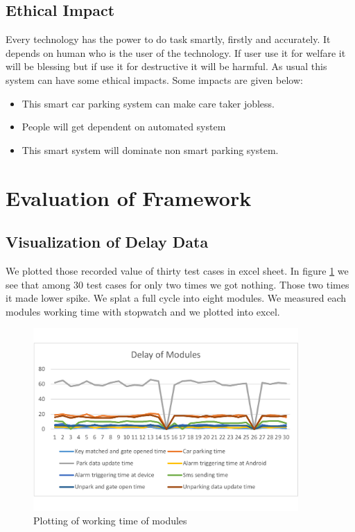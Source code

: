 \subsection{Ethical Impact}
Every technology has the power to do task smartly, firstly and accurately. It depends on human who is the user of the technology. If user use it for welfare it will be blessing but if use it for destructive it will be harmful. As usual this system can have some ethical impacts. Some impacts are given below:
\begin{itemize}
    \item This smart car parking system can make care taker jobless.
    \item People will get dependent on automated system
    \item This smart system will dominate non smart parking system.
\end{itemize}

\section{Evaluation of Framework}

\subsection{Visualization of Delay Data}
We plotted those recorded value of thirty test cases in excel sheet. In figure \ref{chart_} we see that among 30 test cases for only two times we got nothing. Those two times it made lower spike. We splat a full cycle into eight modules. We measured each modules working time with stopwatch and we plotted into excel.

\begin{figure}[H]
\centering
\includegraphics[width=0.9\textwidth]{figures/chart.pdf}
\caption{Plotting of working time of modules}
\label{chart_}
\end{figure}

